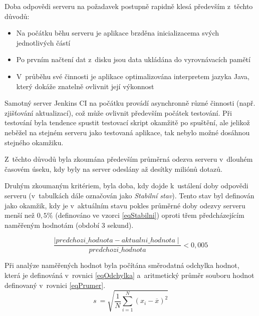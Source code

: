             Doba odpovědi
            serveru na požadavek postupně rapidně klesá především z~těchto důvodů:
            
            \begin{itemize}
                \item Na počátku běhu serveru je aplikace brzděna inicializacema svých jednotlivých částí
                \item Po prvním načtení dat z~disku jsou data ukládána do vyrovnávacích pamětí
                \item V~průběhu své činnosti je aplikace optimalizována interpretem jazyka Java,
                    který dokáže znatelně ovlivnit její výkonnost
            \end{itemize}

            Samotný server Jenkins CI na počátku provádí asynchronně různé činnosti (např. zjišťování aktualizací),
            což může ovlivnit především počátek testování. Při testování byla tendence spustit testovací 
            skript okamžitě po spuštění, ale jelikož neběžel na stejném serveru jako testovaná
            aplikace, tak nebylo možné dosáhnou stejného okamžiku. 

            \medskip
            Z~těchto důvodů byla zkoumána především průměrná odezva serveru v~dlouhém časovém
            úseku, kdy byly na server odeslány až desítky miliónů dotazů.

            Druhým zkoumaným kritériem, byla doba, kdy dojde k~ustálení
            doby odpovědi serveru (v~tabulkách dále označován jako \emph{Stabilní stav}).
            Tento stav byl definován jako okamžik, kdy je v~aktuálním stavu
            pokles průměrné doby odezvy serveru 
            menší než $0,5\%$ (definováno ve vzorci \ref{eqStabilni})
            oproti třem předcházejícím naměřeným hodnotám (období 3 sekund).
            
            \begin{equation}\label{eqStabilni}
                \frac{\mid predchozi\_hodnota - aktualni\_hodnota\mid}{predchozi\_hodnota} < 0,005
            \end{equation}
            \medskip

        
            Při analýze naměřených hodnot byla počítána směrodatná odchylka hodnot, která je
            definováná v~rovnici \ref{eqOdchylka} a~aritmetický průměr souboru hodnot
            definovaný v~rovnici \ref{eqPrumer}.
            \begin{equation}\label{eqOdchylka}
                s~= \sqrt{\frac{1}{N} \sum_{i=1}^N (x_i - \overline{x})^2}      
            \end{equation}

